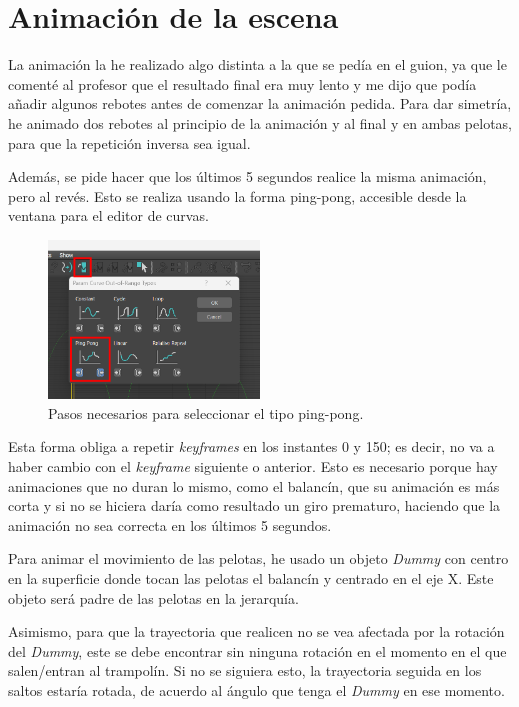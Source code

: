 \documentclass{article}
\begin{document}
\newpage

\section{Animación de la escena}

La animación la he realizado algo distinta a la que se pedía en el guion, ya que le comenté al profesor que el resultado final era muy lento y me dijo que podía añadir algunos rebotes antes de comenzar la animación pedida. Para dar simetría, he animado dos rebotes al principio de la animación y al final y en ambas pelotas, para que la repetición inversa sea igual. 

\bigskip

Además, se pide hacer que los últimos 5 segundos realice la misma animación, pero al revés. Esto se realiza usando la forma ping-pong, accesible desde la ventana para el editor de curvas.

\begin{figure}[H]
   \centering
   \includegraphics[width=0.5\textwidth]{imagenes/misc/ping-pong.png}
   \caption{Pasos necesarios para seleccionar el tipo ping-pong.}
\end{figure}

Esta forma obliga a repetir \textit{keyframes} en los instantes 0 y 150; es decir, no va a haber cambio con el \textit{keyframe} siguiente o anterior. Esto es necesario porque hay animaciones que no duran lo mismo, como el balancín, que su animación es más corta y si no se hiciera daría como resultado un giro prematuro, haciendo que la animación no sea correcta en los últimos 5 segundos.

\bigskip

Para animar el movimiento de las pelotas, he usado un objeto \textit{Dummy} con centro en la superficie donde tocan las pelotas el balancín y centrado en el eje X. Este objeto será padre de las pelotas en la jerarquía.

\bigskip

Asimismo, para que la trayectoria que realicen no se vea afectada por la rotación del \textit{Dummy}, este se debe encontrar sin ninguna rotación en el momento en el que salen/entran al trampolín. Si no se siguiera esto, la trayectoria seguida en los saltos estaría rotada, de acuerdo al ángulo que tenga el \textit{Dummy} en ese momento.
\end{document}
